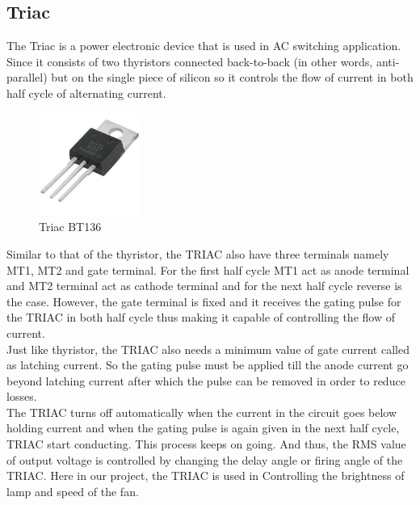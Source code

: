 \subsection{Triac}
The Triac is a power electronic device that is used in AC switching application. Since it consists of two thyristors connected back-to-back (in other words, anti-parallel) but on the single piece of silicon so it controls the flow of current in both half cycle of alternating current. \\
\begin{figure}
	\includegraphics[width=0.3\textwidth]{photos/theory/bt136.jpg}
	\caption{Triac BT136}
\end{figure}
Similar to that of the thyristor, the TRIAC also have three terminals namely MT1, MT2 and gate terminal. For the first half cycle MT1 act as anode terminal and MT2 terminal act as cathode terminal and for the next half cycle reverse is the case. However, the gate terminal is fixed and it receives the gating pulse for the TRIAC in both half cycle thus making it capable of controlling the flow of current.\\
Just like thyristor, the TRIAC also needs a minimum value of gate current called as latching current. So the gating pulse must be applied till the anode current go beyond latching current after which the pulse can be removed in order to reduce losses. \\
The TRIAC turns off automatically when the current in the circuit goes below holding current and when the gating pulse is again given in the next half cycle, TRIAC start conducting. This process keeps on going. And thus, the RMS value of output voltage is controlled by changing the delay angle or firing angle of the TRIAC.
Here in our project, the TRIAC is used in Controlling the brightness of lamp and speed of the fan.\\

